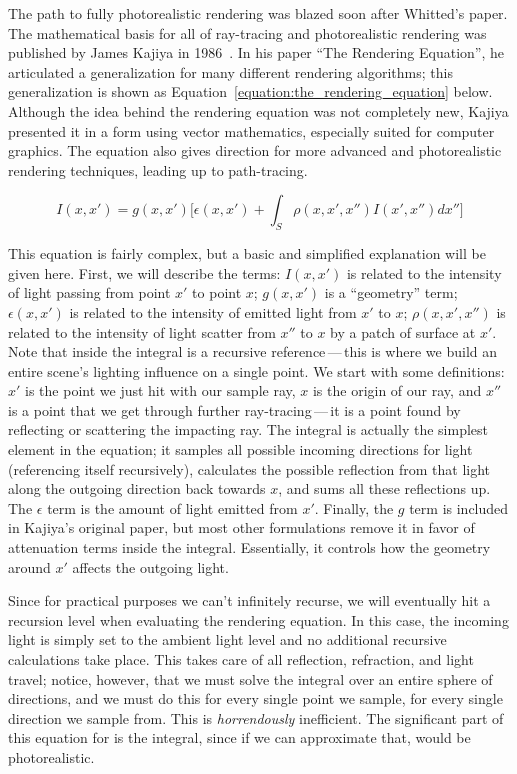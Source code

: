 The path to fully photorealistic rendering was blazed soon after Whitted's paper.
The mathematical basis for all of ray-tracing and photorealistic rendering was published by James Kajiya in 1986~\cite{kajiya1986rendering}.
In his paper ``The Rendering Equation'', he articulated a generalization for many different rendering algorithms; this generalization is shown as Equation~\ref{equation:the_rendering_equation} below.
Although the idea behind the rendering equation was not completely new, Kajiya presented it in a form using vector mathematics, especially suited for computer graphics.
The equation also gives direction for more advanced and photorealistic rendering techniques, leading up to path-tracing.

\begin{equation}
\label{equation:the_rendering_equation}
  I(x, x') = g(x, x') \Big[\epsilon(x, x') + \int_{S} \rho(x, x',x'')I(x', x'')dx''\Big]
\end{equation}

This equation is fairly complex, but a basic and simplified explanation will be given here.
First, we will describe the terms: $I(x, x')$ is related to the intensity of light passing from point $x'$ to point $x$; $g(x, x')$ is a ``geometry'' term; $\epsilon(x, x')$ is related to the intensity of emitted light from $x'$ to $x$; $\rho(x, x',x'')$ is related to the intensity of light scatter from $x''$ to $x$ by a patch of surface at $x'$.
Note that inside the integral is a recursive reference\,---\,this is where we build an entire scene's lighting influence on a single point.
We start with some definitions: $x'$ is the point we just hit with our sample ray, $x$ is the origin of our ray, and $x''$ is a point that we get through further ray-tracing\,---\,it is a point found by reflecting or scattering the impacting ray.
The integral is actually the simplest element in the equation; it samples all possible incoming directions for light (referencing itself recursively), calculates the possible reflection from that light along the outgoing direction back towards $x$, and sums all these reflections up.
The $\epsilon$ term is the amount of light emitted from $x'$.
Finally, the $g$ term is included in Kajiya's original paper, but most other formulations remove it in favor of attenuation terms inside the integral.
Essentially, it controls how the geometry around $x'$ affects the outgoing light.

Since for practical purposes we can't infinitely recurse, we will eventually hit a recursion level when evaluating the rendering equation.
In this case, the incoming light is simply set to the ambient light level and no additional recursive calculations take place.
This takes care of all reflection, refraction, and light travel; notice, however, that we must solve the integral over an entire sphere of directions, and we must do this for every single point we sample, for every single direction we sample from.
This is {\it horrendously\/} inefficient.
The significant part of this equation for \name{} is the integral, since if we can approximate that, \name{} would be photorealistic.

